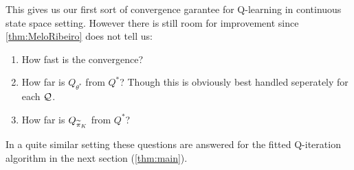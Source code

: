 This gives us our first sort of convergence garantee for Q-learning in
continuous state space setting.
However there is still room for improvement since \cref{thm:MeloRibeiro}
does not tell us:
\begin{enumerate}
  \item How fast is the convergence?
  \item How far is $Q_{\theta^*}$ from $Q^*$?
    Though this is obviously best handled seperately for each $\mathcal{Q}$.
  \item How far is $Q_{\widetilde{\pi}_K}$ from $Q^*$?
\end{enumerate}
In a quite similar setting these questions are answered for the
fitted Q-iteration algorithm in the next section (\cref{thm:main}).

